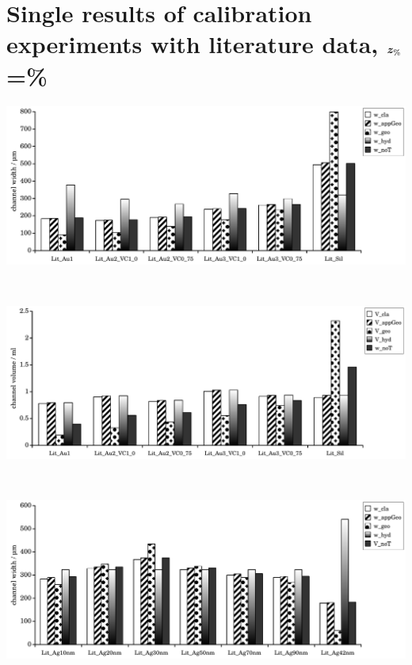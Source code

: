 \section*{Single results of calibration experiments with literature data, 
  $\bm{z_\text{\%}}$\thinspace=\thinspace\%}
\setcounter{subfigure}{0}
\begin{minipage}{\linewidth}
  \centering
  \begin{minipage}{.75\linewidth}
    \includegraphics[width=\linewidth]{./images/data/eval_lit_p16/Lit1Data_w_16p.pdf}
  \end{minipage}\\
  \begin{minipage}{.75\linewidth}
    \includegraphics[width=\linewidth]{./images/data/eval_lit_p16/Lit1Data_V_16p.pdf}
  \end{minipage}\\
  \begin{minipage}{.75\linewidth}
    \includegraphics[width=\linewidth]{./images/data/eval_lit_p16/Lit2Data_w_16p.pdf}

\end{minipage}
\end{minipage}
